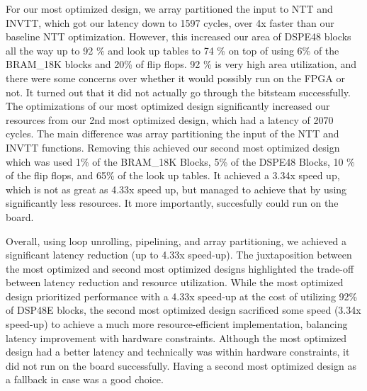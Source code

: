   For our most optimized design, we array partitioned the input to NTT and INVTT, which got our latency down to 1597 cycles,
over 4x faster than our baseline NTT optimization. However, this increased our area of DSPE48 blocks all the way up to 92 \% 
and look up tables to 74 \% on top of using 6\% of the BRAM\_18K blocks and 20\% of flip flops. 92 \% is very high area 
utilization, and there were some concerns over whether it would possibly run on the FPGA or not. It turned out that it did not actually 
go through the bitsteam successfully. The optimizations of our most optimized design significantly increased our resources from our 
2nd most optimized design, which had a latency of 2070 cycles. The main difference was array partitioning the input of the NTT and 
INVTT functions. Removing this achieved our second most optimized design which was used 1\% of the BRAM\_18K Blocks, 5\% of the DSPE48 
Blocks, 10 \% of the flip flops, and  65\% of the look up tables. It achieved a 3.34x speed up, which is not as great as 4.33x speed up,
but managed to achieve that by using significantly less resources. It more importantly, succesfully could run on the board.

  Overall, using loop unrolling, pipelining, and array partitioning, we achieved a significant latency reduction (up to 4.33x speed-up).
The juxtaposition between the most optimized and second most optimized designs highlighted the trade-off between latency reduction and
resource utilization. While the most optimized design prioritized performance with a 4.33x speed-up at the cost of utilizing 92\% of DSP48E
blocks, the second most optimized design sacrificed some speed (3.34x speed-up) to achieve a much more resource-efficient implementation, 
balancing latency improvement with hardware constraints. Although the most optimized design had a better latency and technically was within 
hardware constraints, it did not run on the board successfully. Having a second most optimized design as a fallback in case was a good choice.











